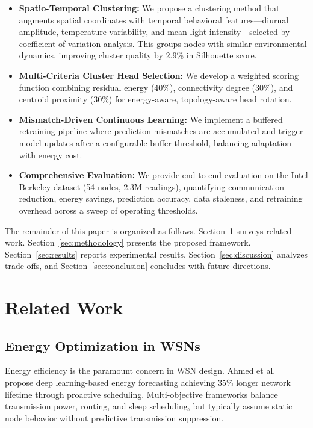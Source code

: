 \documentclass[conference]{IEEEtran}
\begin{document}
\begin{itemize}
    \item \textbf{Spatio-Temporal Clustering:} We propose a clustering method that augments spatial coordinates with temporal behavioral features---diurnal amplitude, temperature variability, and mean light intensity---selected by coefficient of variation analysis. This groups nodes with similar environmental dynamics, improving cluster quality by 2.9\% in Silhouette score.

    \item \textbf{Multi-Criteria Cluster Head Selection:} We develop a weighted scoring function combining residual energy (40\%), connectivity degree (30\%), and centroid proximity (30\%) for energy-aware, topology-aware head rotation.

    \item \textbf{Mismatch-Driven Continuous Learning:} We implement a buffered retraining pipeline where prediction mismatches are accumulated and trigger model updates after a configurable buffer threshold, balancing adaptation with energy cost.

    \item \textbf{Comprehensive Evaluation:} We provide end-to-end evaluation on the Intel Berkeley dataset (54 nodes, 2.3M readings), quantifying communication reduction, energy savings, prediction accuracy, data staleness, and retraining overhead across a sweep of operating thresholds.
\end{itemize}

The remainder of this paper is organized as follows. Section~\ref{sec:related} surveys related work. Section~\ref{sec:methodology} presents the proposed framework. Section~\ref{sec:results} reports experimental results. Section~\ref{sec:discussion} analyzes trade-offs, and Section~\ref{sec:conclusion} concludes with future directions.

\section{Related Work}
\label{sec:related}

\subsection{Energy Optimization in WSNs}

Energy efficiency is the paramount concern in WSN design. Ahmed et al.~\cite{Ahmed2023WSNEnergy} propose deep learning-based energy forecasting achieving 35\% longer network lifetime through proactive scheduling. Multi-objective frameworks balance transmission power, routing, and sleep scheduling, but typically assume static node behavior without predictive transmission suppression.
\end{document}
